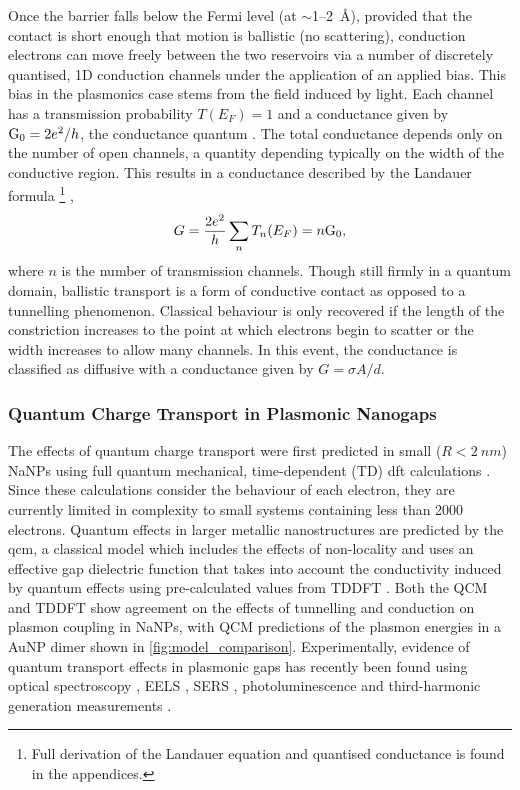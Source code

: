\documentclass{article}
\begin{document}
Once the barrier falls below the Fermi level (at $\sim$1--\SI{2}{\angstrom}), provided that the contact is short enough that motion is ballistic (no scattering), conduction electrons can move freely between the two reservoirs via a number of discretely quantised, 1D conduction channels under the application of an applied bias. This bias in the plasmonics case stems from the field induced by light. Each channel has a transmission probability $T(E_F)=1$ and a conductance given by $\mathrm{G_{0}} = 2e^2/h$, the conductance quantum \cite{landauer1957spatial}. The total conductance depends only on the number of open channels, a quantity depending typically on the width of the conductive region. This results in a conductance described by the Landauer formula%
\footnote{Full derivation of the Landauer equation and quantised conductance is found in the appendices.} \cite{landauer1957spatial},
\begin{equation}
G = \frac{2e^2}{h}\sum_n T_n(E_F) = n\mathrm{G_{0}}, \label{eq:landauer}
\end{equation}
where $n$ is the number of transmission channels. Though still firmly in a quantum domain, ballistic transport is a form of conductive contact as opposed to a tunnelling phenomenon. Classical behaviour is only recovered if the length of the constriction increases to the point at which electrons begin to scatter or the width increases to allow many channels. In this event, the conductance is classified as diffusive with a conductance given by $G=\sigma A/d$.

\subsubsection{Quantum Charge Transport in Plasmonic Nanogaps}

The effects of quantum charge transport were first predicted in small ($R<\SI{2}{nm}$) NaNPs using full quantum mechanical, time-dependent (TD) \gls{dft} calculations \cite{zuloaga2009}. Since these calculations consider the behaviour of each electron, they are currently limited in complexity to small systems containing less than 2000 electrons. Quantum effects in larger metallic nanostructures are predicted by the \gls{qcm}, a classical model which includes the effects of non-locality and uses an effective gap dielectric function that takes into account the conductivity induced by quantum effects using pre-calculated values from TDDFT \cite{esteban2012}. Both the QCM and TDDFT show agreement on the effects of tunnelling and conduction on plasmon coupling in NaNPs, with QCM predictions of the plasmon energies in a AuNP dimer shown in \autoref{fig:model_comparison}. Experimentally, evidence of quantum transport effects in plasmonic gaps has recently been found using optical spectroscopy \cite{savage2012, cha2014, zhu2014}, EELS \cite{scholl2013}, SERS \cite{zhu2014}, photoluminescence \cite{kravtsov2014} and third-harmonic generation measurements \cite{hajisalem2014}.
\end{document}
